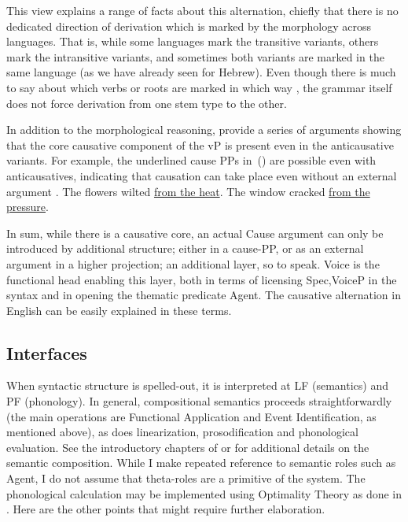 This view explains a range of facts about this alternation, chiefly that there is no dedicated direction of derivation which is marked by the morphology across languages. That is, while some languages mark the transitive variants, others mark the intransitive variants, and sometimes both variants are marked in the same language (as we have already seen for Hebrew). Even though there is much to say about which verbs or roots are marked in which way \citep{haspelmath93,unaccusativity95,arad05}, the grammar itself does not force derivation from one stem type to the other.

In addition to the morphological reasoning, \cite{layering15} provide a series of arguments showing that the core causative component of the vP is present even in the anticausative variants. For example, the underlined cause PPs in~(\nextx) are possible even with anticausatives, indicating that causation can take place even without an external argument \citep{alexiadouetal06,alexiadouetal06nels}.
\pex
	\a The flowers wilted \underline{from the heat}.
	\a The window cracked \underline{from the pressure}.
\xe

In sum, while there is a causative core, an actual Cause argument can only be introduced by additional structure; either in a cause-PP, or as an external argument in a higher projection; an additional layer, so to speak. Voice is the functional head enabling this layer, both in terms of licensing Spec,VoiceP in the syntax and in opening the thematic predicate Agent. The causative alternation in English can be easily explained in these terms.

	\subsection{Interfaces} \label{intro:arch:inter}
When syntactic structure is spelled-out, it is interpreted at LF (semantics) and PF (phonology). In general, compositional semantics proceeds straightforwardly (the main operations are Functional Application and Event Identification, as mentioned above), as does linearization, prosodification and phonological evaluation. See the introductory chapters of \cite{wood15springer} or \cite{myler16mit} for additional details on the semantic composition. While I make repeated reference to semantic roles such as Agent, I do not assume that theta-roles are a primitive of the system. The phonological calculation may be implemented using Optimality Theory \citep{ot} as done in \cite{kastner18nllt}. Here are the other points that might require further elaboration.

